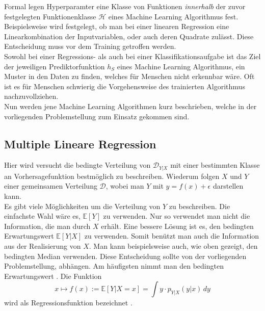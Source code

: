 Formal legen Hyperparamter eine Klasse von Funktionen \textit{innerhalb} der zuvor festgelegten Funktionenklasse $\mathcal{H}$ eines Machine 
Learning Algorithmus fest. Beispielsweise wird festgelegt, ob man bei einer linearen Regression eine Linearkombination der Inputvariablen, oder auch deren Quadrate 
zul\"asst. Diese Entscheidung muss vor dem Training getroffen werden. \\


Sowohl bei einer Regressions- als auch bei einer Klassifikationsaufgabe ist das Ziel der jeweiligen Prediktorfunktion $h_S$ eines Machine Learning Algorithmus, 
ein Muster in den Daten zu finden, welches f\"ur Menschen nicht erkennbar w\"are. Oft ist es f\"ur Menschen schwierig die Vorgehensweise des trainierten Algorithmus 
nachzuvollziehen. \\

Nun werden jene Machine Learning Algorithmen kurz beschrieben, welche in der vorliegenden Problemstellung zum Einsatz gekommen sind.





























\subsection{Multiple Lineare Regression}

Hier wird versucht die bedingte Verteilung von $\mathcal{D}_{Y|X}$ mit einer bestimmten Klasse an Vorhersagefunktion bestm\"oglich zu beschreiben. 
Wiederum folgen $X$ und $Y$ einer gemeinsamen Verteilung $\mathcal{D}$, wobei man $Y$ mit $y = f(x) + \epsilon$ darstellen kann. \\

Es gibt viele M\"oglichkeiten um die Verteilung von $Y$ zu beschreiben. Die einfachste Wahl w\"are es, $\mathbb{E}[Y]$ zu verwenden. Nur so verwendet man nicht die 
Information, die man durch $X$ erh\"alt. Eine bessere L\"osung ist es, den bedingten Erwartungswert $\mathbb{E}[Y|X]$ zu verwenden. Somit ben\"utzt man auch die Information aus der 
Realisierung von $X$. Man kann beispielsweise auch, wie oben gezeigt, den bedingten Median verwenden. Diese Entscheidung sollte von der vorliegenden Problemstellung, 
abh\"angen. Am h\"aufigsten nimmt man den bedingten Erwartungswert \cite{bishop}. Die Funktion 
$$ x \mapsto f(x) := \mathbb{E}[Y|X = x] = \int y \cdot p_{Y|X}(y|x) \,dy $$
wird als Regressionsfunktion bezeichnet \cite{wasserman}. \\

